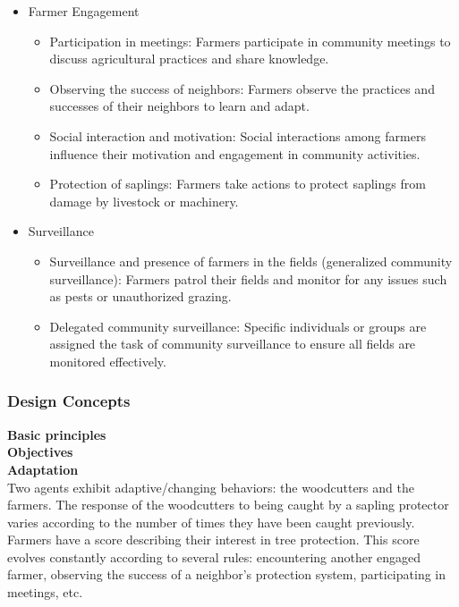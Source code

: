 \documentclass{article}
\begin{document}
\begin{itemize}
            \item Farmer Engagement
            \begin{itemize}
                \item Participation in meetings: Farmers participate in community meetings to discuss agricultural practices and share knowledge.
                \item Observing the success of neighbors: Farmers observe the practices and successes of their neighbors to learn and adapt.
                \item Social interaction and motivation: Social interactions among farmers influence their motivation and engagement in community activities.
                \item Protection of saplings: Farmers take actions to protect saplings from damage by livestock or machinery.
            \end{itemize}

            \item Surveillance
            \begin{itemize}
                \item Surveillance and presence of farmers in the fields (generalized community surveillance): Farmers patrol their fields and monitor for any issues such as pests or unauthorized grazing.
                \item Delegated community surveillance: Specific individuals or groups are assigned the task of community surveillance to ensure all fields are monitored effectively.
            \end{itemize}
        \end{itemize}


    \subsubsection{Design Concepts}
        \textbf{Basic principles}\\

        

        \textbf{Objectives}\\
        \textbf{Adaptation}\\
        
        Two agents exhibit adaptive/changing behaviors: the woodcutters and the farmers. The response of the woodcutters to being caught by a sapling protector varies according to the number of times they have been caught previously. Farmers have a score describing their interest in tree protection. This score evolves constantly according to several rules: encountering another engaged farmer, observing the success of a neighbor's protection system, participating in meetings, etc.
\end{document}

